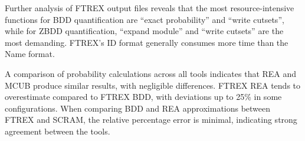 Further analysis of FTREX output files reveals that the most resource-intensive functions for BDD quantification are ``exact probability'' and ``write cutsets'', while for ZBDD quantification, ``expand module'' and ``write cutsets'' are the most demanding. FTREX's ID format generally consumes more time than the Name format.

A comparison of probability calculations across all tools indicates that REA and MCUB produce similar results, with negligible differences. FTREX REA tends to overestimate compared to FTREX BDD, with deviations up to 25\% in some configurations. When comparing BDD and REA approximations between FTREX and SCRAM, the relative percentage error is minimal, indicating strong agreement between the tools. 